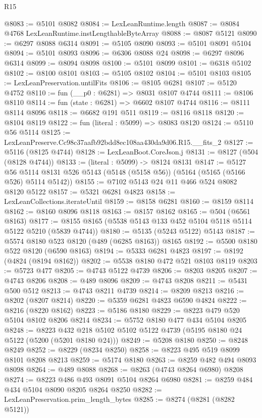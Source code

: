 \begin{lexlean}{R15}
\begin{coremodule}
{{{{{{{{{{{@8083 := @5101 @8082
@8084 := LexLeanRuntime.length
@8087 := @8084 @4768 LexLeanRuntime.instLengthableByteArray
@8088 := @8087 @5121
@8090 := @6297 @8088 @6314
@8091 := @5105 @8090
@8093 := @5101 @8091 @5104
@8094 := @5101 @8093
@8096 := @6306 @8088 @24
@8098 := @6297 @8096 @6314
@8099 := @8094 @8098
@8100 := @5101 @8099
@8101 := @6318 @5102
@8102 := @8100 @8101
@8103 := @5105 @8102
@8104 := @5101 @8103
@8105 := LexLeanPreservation.untilFits
@8106 := @8105 @6281
@8107 := @5120 @4752
@8110 := fun (__p0 : @6281) => @8031 @8107 @4744
@8111 := @8106 @8110
@8114 := fun (state : @6281) => @6602 @8107 @4744
@8116 := @8111 @8114 @8096
@8118 := @6682 @191 @511
@8119 := @8116 @8118
@8120 := @8104 @8119
@8122 := fun (literal : @5099) => @8083 @8120
@8124 := @5110 @56 @5114
@8125 := LexLeanPreserve.Cc98c37aafb92bdd8ec108aa430da9d06.R15.__fits_2
@8127 := @5116 (@8125 @4744)
@8128 := LexLeanBoot.CoreJson.j
@8131 := @8127 (@504 (@8128 @4744))
@8133 := (literal : @5099) -> @8124 @8131
@8147 := @5127
    @56
    @5114
    @8131
    @526
    @5143
    (@5148 (@5158 @56))
    (@5164 (@5165 (@5166 @526) @5114 @5142))
@8155 := @7102 @5143 @24 @11 @466 @524 @8082 @8120 @5122
@8157 := @5321 @6281 @4823
@8158 := LexLeanCollections.iterateUntil
@8159 := @8158 @6281
@8160 := @8159 @8114
@8162 := @8160 @8096 @8118
@8163 := @8157 @8162
@8165 := @504 (@6561 @8163)
@8177 := @8155 @8165 (@5538 @5143 @133 @452 @5104 @5118 @5114 @5122 @5210 (@5839 @4744))
@8180 := @5135 (@5243 @5122) @5143
@8187 := @5574 @8180 @523 @8120 (@489 (@6285 @8163)) @8165
@8192 := @5500 @8180 @522 @8120 (@6590 @8163)
@8194 := @5333 @6281 @4823
@8197 := @8192 (@4824 (@8194 @8162))
@8202 := @5538 @8180 @472 @521 @8103 @8119
@8203 := @5723 @477
@8205 := @4743 @5122 @4739
@8206 := @8203 @8205
@8207 := @4743 @8206
@8208 := @489 @8096
@8209 := @4743 @8208
@8211 := @5431 @500 @512
@8213 := @4743 @8211 @4739
@8214 := @8209 @8213
@8216 := @8202 (@8207 @8214)
@8220 := @5359 @6281 @4823 @6590 @4824
@8222 := @8216 (@8220 @8162)
@8223 := @5186 @8180
@8229 := @8223 @479 @520 @5104 @8102 @8206 @8214
@8234 := @5752 @8180 @477 @434 @5104 @8205
@8248 := @8223 @432 @218 @5102 @5102 @5122 @4739 (@5195 @8180 @24 @5122 (@5200 (@5201 @8180 @24)))
@8249 := @5208 @8180
@8250 := @8248 @8249
@8252 := @8229 (@8234 @8250)
@8258 := @8223 @495 @519 @8099 @8101 @8208 @8213
@8259 := @5174 @8180
@8263 := @8259 @482 @494 @8093 @8098
@8264 := @489 @8088
@8268 := @8263 (@4743 @8264 @6980) @8208
@8274 := @8223 @486 @493 @8091 @5104 @8264 @6980
@8281 := @8259 @484 @434 @5104 @8090 @8205 @8264 @8250
@8282 := LexLeanPreservation.prim_length_bytes
@8285 := @8274 (@8281 (@8282 @5121))
}}}}}}}}}}}
\end{coremodule}
\end{lexlean}
